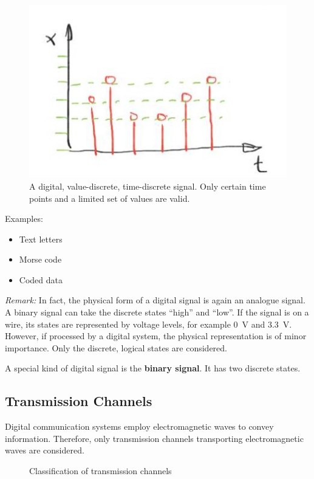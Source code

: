 \begin{figure}[H]
	\centering
	\includegraphics{../chapter01/Signal_Digital.jpg}
	\caption[A digital, value-discrete, time-discrete signal]{A digital, value-discrete, time-discrete signal. Only certain time points and a limited set of values are valid.}
	\label{fig:ch01:Signal_Digital}
\end{figure}

Examples:
\begin{itemize}
	\item Text letters
	\item Morse code
	\item Coded data
\end{itemize}

\textit{Remark:} In fact, the physical form of a digital signal is again an analogue signal. A binary signal can take the discrete states ``high'' and ``low''. If the signal is on a wire, its states are represented by voltage levels, for example \SI{0}{V} and \SI{3.3}{V}. However, if processed by a digital system, the physical representation is of minor importance. Only the discrete, logical states are considered.

A special kind of digital signal is the \textbf{binary signal}. It has two discrete states.


\subsection{Transmission Channels}

Digital communication systems employ electromagnetic waves to convey information. Therefore, only transmission channels transporting electromagnetic waves are considered.

\begin{figure}[H]
	\centering
	\caption{Classification of transmission channels}
	\label{fig:ch01:trans_ch_classif}
\end{figure}


